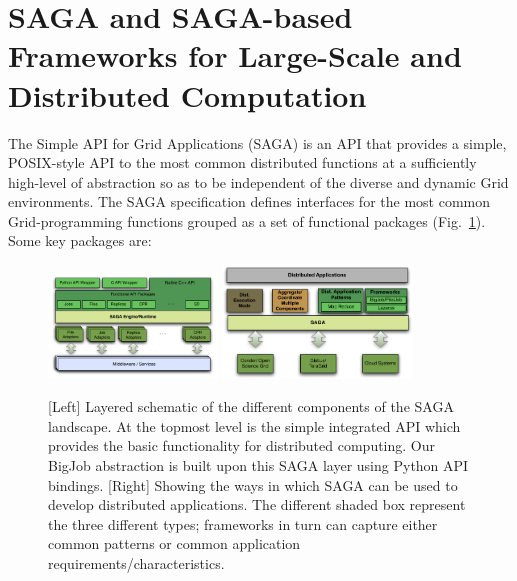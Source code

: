 \documentclass{rspublic}
\begin{document}
\section{SAGA and SAGA-based Frameworks for Large-Scale and
 Distributed Computation}\label{Sec:SAGA}


The Simple API for Grid Applications (SAGA) is an API
that provides a simple, POSIX-style API to the most common distributed
functions at a sufficiently high-level of abstraction so as to be
independent of the diverse and dynamic Grid environments. The SAGA
specification defines interfaces for the most common Grid-programming
functions grouped as a set of functional packages
(Fig.~\ref{Fig:SAGA1}). Some key packages are:

\begin{figure}[!ht]
 \begin{center}
     \includegraphics[width=0.40\textwidth]{stci_saga_figures-1.pdf}
    \includegraphics[width=0.45\textwidth]{distributed_applications_saga_figure.pdf}
\end{center}
\caption{\small [Left] Layered schematic of the different components of
  the SAGA landscape. At the topmost level is the simple integrated
  API which provides the basic functionality for distributed
  computing. Our BigJob abstraction is built upon this SAGA layer
  using Python API bindings. [Right] Showing the ways in which SAGA can be
  used to develop distributed applications. The different shaded box
  represent the three different types; frameworks in turn can capture
  either common patterns or common application
  requirements/characteristics.} \label{Fig:SAGA1}
\end{figure}
\end{document}
